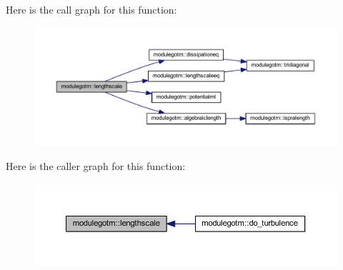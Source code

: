 Here is the call graph for this function\+:\nopagebreak
\begin{figure}[H]
\begin{center}
\leavevmode
\includegraphics[width=350pt]{namespacemodulegotm_a2d9e32d408a390b64575234c5dd95f62_cgraph}
\end{center}
\end{figure}
Here is the caller graph for this function\+:\nopagebreak
\begin{figure}[H]
\begin{center}
\leavevmode
\includegraphics[width=350pt]{namespacemodulegotm_a2d9e32d408a390b64575234c5dd95f62_icgraph}
\end{center}
\end{figure}
\mbox{\label{namespacemodulegotm_a82edc4e2eec49fb4f24fc31918908aef}} 
